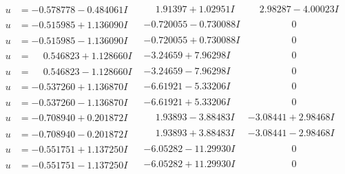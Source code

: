 \documentclass[1p]{elsarticle_modified}
\theoremstyle{definition}
\begin{document}
$$\begin{array}{c|c|c}
\begin{aligned}
u &= -0.578778 - 0.484061 I\end{aligned}
 & \phantom{-}1.91397 + 1.02951 I & \phantom{-}2.98287 - 4.00023 I \\ \hline\begin{aligned}
u &= -0.515985 + 1.136090 I\end{aligned}
 & -0.720055 - 0.730088 I & \phantom{-0.000000 } 0 \\ \hline\begin{aligned}
u &= -0.515985 - 1.136090 I\end{aligned}
 & -0.720055 + 0.730088 I & \phantom{-0.000000 } 0 \\ \hline\begin{aligned}
u &= \phantom{-}0.546823 + 1.128660 I\end{aligned}
 & -3.24659 + 7.96298 I & \phantom{-0.000000 } 0 \\ \hline\begin{aligned}
u &= \phantom{-}0.546823 - 1.128660 I\end{aligned}
 & -3.24659 - 7.96298 I & \phantom{-0.000000 } 0 \\ \hline\begin{aligned}
u &= -0.537260 + 1.136870 I\end{aligned}
 & -6.61921 - 5.33206 I & \phantom{-0.000000 } 0 \\ \hline\begin{aligned}
u &= -0.537260 - 1.136870 I\end{aligned}
 & -6.61921 + 5.33206 I & \phantom{-0.000000 } 0 \\ \hline\begin{aligned}
u &= -0.708940 + 0.201872 I\end{aligned}
 & \phantom{-}1.93893 - 3.88483 I & -3.08441 + 2.98468 I \\ \hline\begin{aligned}
u &= -0.708940 - 0.201872 I\end{aligned}
 & \phantom{-}1.93893 + 3.88483 I & -3.08441 - 2.98468 I \\ \hline\begin{aligned}
u &= -0.551751 + 1.137250 I\end{aligned}
 & -6.05282 - 11.29930 I & \phantom{-0.000000 } 0 \\ \hline\begin{aligned}
u &= -0.551751 - 1.137250 I\end{aligned}
 & -6.05282 + 11.29930 I & \phantom{-0.000000 } 0 \\ \hline\begin{aligned}

\end{aligned}
\end{array}$$
\end{document}
